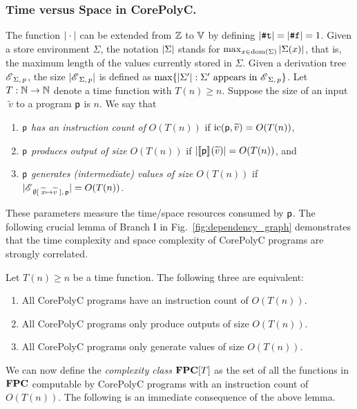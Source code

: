 \documentclass[runningheads]{llncs}
\begin{document}
\subsubsection{Time versus Space in CorePolyC.}
The function $\vert\cdot\vert$ can be extended from $\mathbb{Z}$ to $\mathbb{V}$ by defining $\vert\texttt{\#}\mathtt{t}\vert=\vert\texttt{\#}\mathtt{f}\vert=1$.
Given a store environment $\Sigma$, the notation $\vert\Sigma\vert$ stands for $\max_{x\in\mathrm{dom}(\Sigma)}\vert\Sigma(x)\vert$, that is, the maximum length of the values currently stored in $\Sigma$.
Given a derivation tree $\mathscr{E}_{\;\Sigma,\,p}$, the size $\vert\mathscr{E}_{\;\Sigma,\,p}\vert$ is defined as
$\max \{\vert\Sigma'\vert:\Sigma'\text{ appears in }\mathscr{E}_{\;\Sigma,\,p}\}$.
Let $T:\mathbb{N}\to\mathbb{N}$ denote a time function with $T(n)\ge n$.
Suppose the size of an input $\;\widetilde{v}$ to a program $\mathsf{p}$ is $n$.
We say that
\begin{enumerate}
    \item  $\mathsf{p}$ \textit{has an instruction count of} $O(T(n))$ if $\mathrm{ic}(\mathsf{p}, \widetilde{v}) = O(T(n))$,
    \item  $\mathsf{p}$ \textit{produces output of size} $O(T(n))$ if $\vert\llbracket\mathsf{p}\rrbracket_{}(\widetilde{v})\vert=O(T(n))$, and
    \item $\mathsf{p}$ \textit{generates (intermediate) values of size} $O(T(n))$ if $\vert\mathscr{E}_{\;\emptyset[\;\widetilde{x}\mapsto\widetilde{v}\;],\,\mathsf{p}}\vert=O(T(n))$.
\end{enumerate}
These parameters measure the time/space resources consumed by $\mathsf{p}$.
The following crucial lemma of Branch I in Fig.~\ref{fig:dependency_graph} demonstrates that the time complexity and space complexity of CorePolyC programs are strongly correlated.
\begin{lemma}\label{lem:time-size}
Let $T(n)\ge n$ be a time function.
The following three are equivalent:
\begin{enumerate}
    \item All CorePolyC programs have an instruction count of $O(T(n))$.
    \item All CorePolyC programs only produce outputs of size $O(T(n))$.
    \item All CorePolyC programs only generate values of size $O(T(n))$.
\end{enumerate}
\end{lemma}
We can now define the \textit{complexity class} $\mathbf{FPC}[T]$ as the set of all the functions in $\mathbf{FPC}$ computable by CorePolyC programs with an instruction count of $O(T(n))$.
The following is an immediate consequence of the above lemma.
\end{document}
